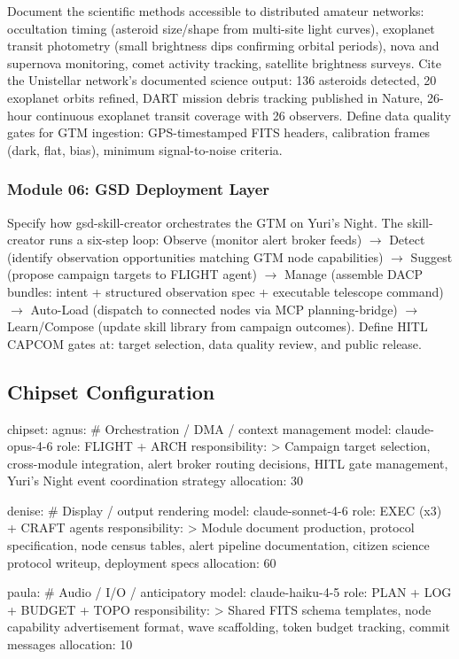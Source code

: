 \documentclass[11pt,letterpaper]{article}
\begin{document}
Document the scientific methods accessible to distributed amateur networks: occultation timing (asteroid size/shape from multi-site light curves), exoplanet transit photometry (small brightness dips confirming orbital periods), nova and supernova monitoring, comet activity tracking, satellite brightness surveys. Cite the Unistellar network's documented science output: 136 asteroids detected, 20 exoplanet orbits refined, DART mission debris tracking published in Nature, 26-hour continuous exoplanet transit coverage with 26 observers. Define data quality gates for GTM ingestion: GPS-timestamped FITS headers, calibration frames (dark, flat, bias), minimum signal-to-noise criteria.

\subsubsection{Module 06: GSD Deployment Layer}

Specify how gsd-skill-creator orchestrates the GTM on Yuri's Night. The skill-creator runs a six-step loop: Observe (monitor alert broker feeds) $\rightarrow$ Detect (identify observation opportunities matching GTM node capabilities) $\rightarrow$ Suggest (propose campaign targets to FLIGHT agent) $\rightarrow$ Manage (assemble DACP bundles: intent + structured observation spec + executable telescope command) $\rightarrow$ Auto-Load (dispatch to connected nodes via MCP planning-bridge) $\rightarrow$ Learn/Compose (update skill library from campaign outcomes). Define HITL CAPCOM gates at: target selection, data quality review, and public release.

\subsection{Chipset Configuration}

\begin{asciibox}
chipset:
  agnus:                          # Orchestration / DMA / context management
    model: claude-opus-4-6
    role: FLIGHT + ARCH
    responsibility: >
      Campaign target selection, cross-module integration,
      alert broker routing decisions, HITL gate management,
      Yuri's Night event coordination strategy
    allocation: 30%

  denise:                         # Display / output rendering
    model: claude-sonnet-4-6
    role: EXEC (x3) + CRAFT agents
    responsibility: >
      Module document production, protocol specification,
      node census tables, alert pipeline documentation,
      citizen science protocol writeup, deployment specs
    allocation: 60%

  paula:                          # Audio / I/O / anticipatory
    model: claude-haiku-4-5
    role: PLAN + LOG + BUDGET + TOPO
    responsibility: >
      Shared FITS schema templates, node capability
      advertisement format, wave scaffolding,
      token budget tracking, commit messages
    allocation: 10%
\end{asciibox}
\end{document}
